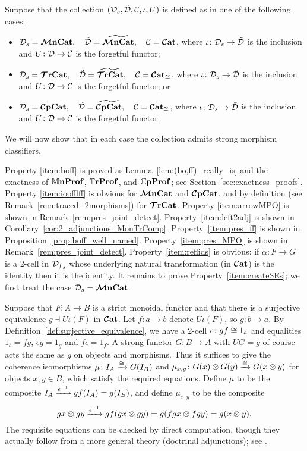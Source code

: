 \documentclass[11pt,oneside,article]{memoir}
\begin{document}
\begin{example}
      \label{ex:strictifiable}
Suppose that the collection $(\mathcal{D}_s,\tilde{\mathcal{D}},\mathcal{C},\iota,U)$ is defined as in one of the
following cases:
\begin{itemize}
   \item $\mathcal{D}_s=\bm{\mathcal{M}}\mathbf{nCat}, \quad \tilde{\mathcal{D}}=\widetilde{\bm{\mathcal{M}}\mathbf{nCat}}, \quad \mathcal{C}=\bm{\mathcal{C}}\mathbf{at}$, where
      $\iota\colon\mathcal{D}_s\to\tilde{\mathcal{D}}$ is the inclusion and $U\colon\tilde{\mathcal{D}}\to\mathcal{C}$ is the
      forgetful functor;
   \item $\mathcal{D}_s=\bm{\mathcal{T}}\mathbf{rCat}, \quad \tilde{\mathcal{D}}=\widetilde{\bm{\mathcal{T}}\mathbf{rCat}}, \quad \mathcal{C}=\bm{\mathcal{C}}\mathbf{at}_{\cong}$, where
      $\iota\colon\mathcal{D}_s\to\tilde{\mathcal{D}}$ is the inclusion and $U\colon\tilde{\mathcal{D}}\to\mathcal{C}$ is the
      forgetful functor; or
   \item $\mathcal{D}_s=\bm{\mathcal{C}}\mathbf{pCat}, \quad \tilde{\mathcal{D}}=\widetilde{\bm{\mathcal{C}}\mathbf{pCat}}, \quad \mathcal{C}=\bm{\mathcal{C}}\mathbf{at}_{\cong}$, where
      $\iota\colon\mathcal{D}_s\to\tilde{\mathcal{D}}$ is the inclusion and $U\colon\tilde{\mathcal{D}}\to\mathcal{C}$ is the
      forgetful functor.
\end{itemize}
We will now show that in each case the collection admits strong morphism classifiers.

Property \ref{item:boff} is proved as Lemma~\ref{lem:(bo,ff)_really_is} and the exactness of
$\mathbb{M}\mathbf{nProf}$, $\mathbb{T}\mathbf{rProf}$, and $\mathbb{C}\mathbf{pProf}$; see Section~\ref{sec:exactness_proofs}. Property
\ref{item:ioofflff} is obvious for $\bm{\mathcal{M}}\mathbf{nCat}$ and $\bm{\mathcal{C}}\mathbf{pCat}$, and by definition (see
Remark~\ref{rem:traced_2morphisms}) for $\bm{\mathcal{T}}\mathbf{rCat}$.  Property \ref{item:arrowMPO} is shown in
Remark~\ref{rem:pres_joint_detect}. Property~\ref{item:left2adj} is shown in
Corollary~\ref{cor:2_adjunctions_MonTrComp}. Property~\ref{item:pres_ff} is shown in
Proposition~\ref{prop:boff_well_named}. Property~\ref{item:pres_MPO} is shown in
Remark~\ref{rem:pres_joint_detect}. Property~\ref{item:reflids} is obvious: if $\alpha\colon F\to G$
is a 2-cell in $\mathcal{D_s}_s$ whose underlying natural transformation (in $\bm{\mathcal{C}}\mathbf{at}$) is the identity
then it is the identity. It remains to prove Property~\ref{item:createSEs}; we first treat the case
$\mathcal{D}_s=\bm{\mathcal{M}}\mathbf{nCat}$.

Suppose that $F\colon A\to B$ is a strict monoidal functor and that there is a surjective
equivalence $g\dashv U\iota(F)$ in $\bm{\mathcal{C}}\mathbf{at}$. Let $f\colon a\to b$ denote $U\iota(F)$, so $g\colon
b\to a$. By Definition~\ref{def:surjective_equivalence}, we have a 2-cell $\epsilon\colon gf\cong
1_a$ and equalities $1_b=fg$, $\epsilon g=1_g$ and $f\epsilon=1_f$. A strong functor $G\colon B\to
A$ with $UG=g$ of course acts the same as $g$ on objects and morphisms. Thus it suffices to give the
coherence isomorphisms $\mu\colon I_A\xrightarrow{\cong}G(I_B)$ and $\mu_{x,y}\colon G(x)\otimes
G(y)\xrightarrow{\cong} G(x\otimes y)$ for objects $x,y\in B$, which satisfy the required equations. Define
$\mu$ to be the composite $I_A\xrightarrow{\epsilon^{-1}}gf(I_A)=g(I_B)$, and define $\mu_{x,y}$ to be the
composite
\[
   gx\otimes gy\xrightarrow{\epsilon^{-1}}gf(gx\otimes gy)=g(fgx\otimes fgy)=g(x\otimes y).
\]
The requisite equations can be checked by direct computation, though they actually follow from a
more general theory (doctrinal adjunctions); see \cite{Kelly}.


\end{example}
\end{document}

